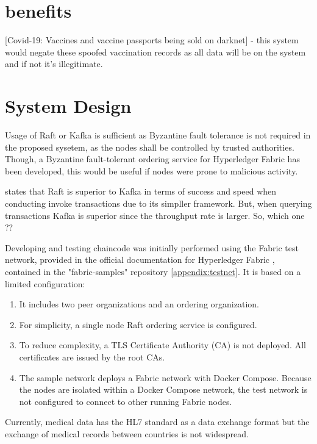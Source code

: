 \section{benefits}
[Covid-19: Vaccines and vaccine passports being sold on darknet] - this system would negate these spoofed vaccination records as all data will be on the system and if not it's illegitimate.
\linebreak[3]

\section{System Design}

Usage of Raft or Kafka is sufficient as Byzantine fault tolerance is not required in the proposed sysetem, as the nodes shall be controlled by trusted authorities.
Though, a Byzantine fault-tolerant ordering service for Hyperledger Fabric has been developed, this would be useful if nodes were prone to malicious activity. \cite{sousa_byzantine_2018}

\cite{yusuf1_comparison_2020} states that Raft is superior to Kafka in terms of success and speed when conducting invoke transactions due to its simpller framework. But, when querying transactions Kafka is superior since the throughput rate is larger.
So, which one ??

Developing and testing chaincode was initially performed using the Fabric test network, provided in the official documentation for Hyperledger Fabric \cite{noauthor_using_nodate}, contained in the "fabric-samples" repository \ref{appendix:testnet}.
It is based on a limited configuration:
\begin{enumerate}
\item{It includes two peer organizations and an ordering organization.}
\item{For simplicity, a single node Raft ordering service is configured.}
\item{To reduce complexity, a TLS Certificate Authority (CA) is not deployed. All certificates are issued by the root CAs.}
\item{The sample network deploys a Fabric network with Docker Compose. Because the nodes are isolated within a Docker Compose network, the test network is not configured to connect to other running Fabric nodes.} \cite{noauthor_using_nodate}
\end{enumerate}


Currently, medical data has the HL7 standard as a data exchange format but the
exchange of medical records between countries is not widespread. \cite{kung_personal_2020}

